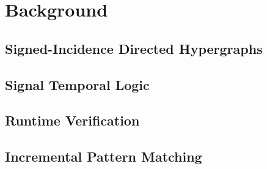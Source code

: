 \documentclass[runningheads]{llncs}
\begin{document}
\section{Background}
\label{sec:background}

\subsection{Signed-Incidence Directed Hypergraphs}

\subsection{Signal Temporal Logic}

\subsection{Runtime Verification}

\subsection{Incremental Pattern Matching}

\end{document}
